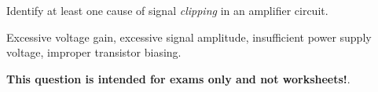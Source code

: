 

Identify at least one cause of signal {\it clipping} in an amplifier circuit.







Excessive voltage gain, excessive signal amplitude, insufficient power supply voltage, improper transistor biasing.







{\bf This question is intended for exams only and not worksheets!}.



